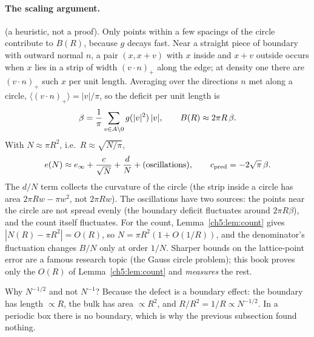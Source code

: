 \paragraph{The scaling argument.} \tierC{} (a heuristic, not a proof). Only points within a few spacings of the circle
contribute to $B(R)$, because $g$ decays fast. Near a straight piece of boundary with outward normal $n$, a pair
$(x,x+v)$ with $x$ inside and $x+v$ outside occurs when $x$ lies in a strip of width $(v\cdot n)_+$ along the edge;
at density one there are $(v\cdot n)_+$ such $x$ per unit length. Averaging over the directions $n$ met along a circle,
$\langle(v\cdot n)_+\rangle=|v|/\pi$, so the deficit per unit length is
\[
\beta=\frac1\pi\sum_{v\in A\setminus0}g(|v|^2)\,|v| ,\qquad B(R)\approx2\pi R\,\beta .
\]
With $N\approx\pi R^2$, i.e.\ $R\approx\sqrt{N/\pi}$,
\[
e(N)\approx e_\infty+\frac{c}{\sqrt N}+\frac dN+(\text{oscillations}),\qquad c_{\rm pred}=-2\sqrt\pi\,\beta .
\]
The $d/N$ term collects the curvature of the circle (the strip inside a circle has area $2\pi Rw-\pi w^2$, not
$2\pi Rw$). The oscillations have two sources: the points near the circle are not spread evenly (the boundary deficit
fluctuates around $2\pi R\beta$), and the count itself fluctuates. For the count, Lemma~\ref{ch5:lem:count} gives
$|N(R)-\pi R^2|=O(R)$, so $N=\pi R^2(1+O(1/R))$, and the denominator's fluctuation changes $B/N$ only at order
$1/N$. Sharper bounds on the lattice-point error are a famous research topic (the Gauss circle problem); this book
proves only the $O(R)$ of Lemma~\ref{ch5:lem:count} and \emph{measures} the rest.

Why $N^{-1/2}$ and not $N^{-1}$? Because the defect is a boundary effect: the boundary has length $\propto R$, the
bulk has area $\propto R^2$, and $R/R^2=1/R\propto N^{-1/2}$. In a periodic box there is no boundary, which is why the
previous subsection found nothing.

